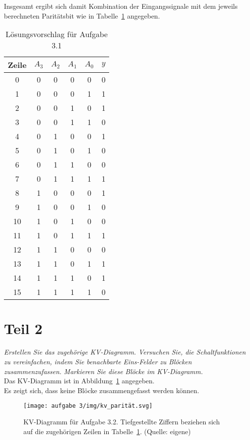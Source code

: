 \noindent
Insgesamt ergibt sich damit Kombination der Eingangssignale mit dem jeweils berechneten Paritätsbit wie in Tabelle~\ref{tab:paritätsbit} angegeben.


\begin{table}[ht]
    \setlength{\tabcolsep}{0.5em}
    \def\arraystretch{1.5}
    \centering
   \begin{tabular}{|c|c|c|c|c||c|}
        \hline
        \textbf{Zeile} & $A_3$ & $A_2$ & $A_1$ & $A_0$ & $y$ \\
        \hline \hline
        0  & 0 & 0 & 0 & 0 & 0 \\ \hline
        1  & 0 & 0 & 0 & 1 & 1 \\ \hline
        2  & 0 & 0 & 1 & 0 & 1 \\ \hline
        3  & 0 & 0 & 1 & 1 & 0 \\ \hline
        4  & 0 & 1 & 0 & 0 & 1 \\ \hline
        5  & 0 & 1 & 0 & 1 & 0 \\ \hline
        6  & 0 & 1 & 1 & 0 & 0 \\ \hline
        7  & 0 & 1 & 1 & 1 & 1 \\ \hline
        8  & 1 & 0 & 0 & 0 & 1 \\ \hline
        9  & 1 & 0 & 0 & 1 & 0 \\ \hline
        10 & 1 & 0 & 1 & 0 & 0 \\ \hline
        11 & 1 & 0 & 1 & 1 & 1 \\ \hline
        12 & 1 & 1 & 0 & 0 & 0 \\ \hline
        13 & 1 & 1 & 0 & 1 & 1 \\ \hline
        14 & 1 & 1 & 1 & 0 & 1 \\ \hline
        15 & 1 & 1 & 1 & 1 & 0 \\
        \hline
    \end{tabular}
    \caption{Lösungsvorschlag für Aufgabe 3.1}
    \label{tab:paritätsbit}
\end{table}

\section{Teil 2}

\textit{Erstellen Sie das zugehörige KV-Diagramm.
Versuchen Sie, die Schaltfunktionen zu vereinfachen, indem Sie benachbarte Eins-Felder zu Blöcken zusammenzufassen. Markieren Sie diese Blöcke im KV-Diagramm.}\\

\noindent
Das KV-Diagramm ist in Abbildung~\ref{fig:kv_parität} angegeben.\\
Es zeigt sich, dass keine Blöcke zusammengefasst werden können.


\begin{figure}
    \centering
    \texttt{[image: aufgabe 3/img/kv\_parität.svg]}
    \caption{KV-Diagramm für Aufgabe 3.2. Tiefgestellte Ziffern beziehen sich auf die zugehörigen Zeilen in Tabelle~\ref{tab:paritätsbit}.  (Quelle: eigene)}
    \label{fig:kv_parität}
\end{figure}
